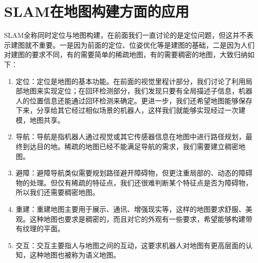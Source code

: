 \chapter{SLAM在地图构建方面的应用}
SLAM全称同时定位与地图构建，在前面我们一直讨论的是定位问题，但这并不表示建图就不重要。一是因为前面的定位、位姿优化等是建图的基础，二是因为人们对建图的要求不同，有的需要简单的稀疏地图，有的需要稠密的地图，大致归纳如下：\par
\begin{enumerate}
	\item 定位：定位是地图的基本功能。在前面的视觉里程计部分，我们讨论了利用局部地图来实现定位；在回环检测部分，我们发现只要有全局描述子信息，机器人的位置信息还能通过回环检测来确定。更进一步，我们还希望地图能够保存下来，分享给其它经过相似场景的机器人，这样我们就能够实现经过一次建模，地图共享。
	\item 导航：导航是指机器人通过视觉或其它传感器信息在地图中进行路径规划，最终到达目的地。稀疏的地图已经不能满足导航的需求，我们需要建立稠密地图。
	\item 避障：避障导航类似需要规划路径避开障碍物，但更注重局部的、动态的障碍物的处理。但仅有稀疏的特征点，我们还很难判断某个特征点是否为障碍物， 所以我们还需要稠密地图。
	\item 重建：重建地图主要用于展示、通讯、增强现实等，这样的地图要求舒服、美观。这种地图也要求是稠密的，而且对它的外观有一些要求，希望能够构建带有纹理的平面。
	\item 交互：交互主要指人与地图之间的互动，这要求机器人对地图有更高层面的认知，这种地图也被称为语义地图。
\end{enumerate}
